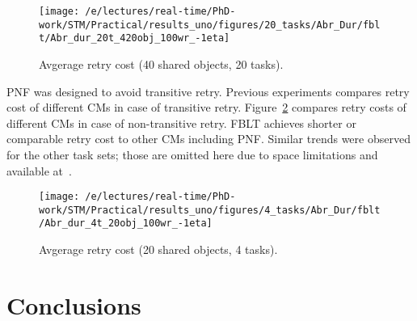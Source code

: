 \documentclass[conference]{IEEEtran}
\begin{document}
%
\begin{figure}
\centering
\texttt{[image: /e/lectures/real-time/PhD-work/STM/Practical/results\_uno/figures/20\_tasks/Abr\_Dur/fblt/Abr\_dur\_20t\_420obj\_100wr\_-1eta]}
\caption{Avgerage retry cost (40 shared objects, 20 tasks).}
\label{fig-RC-fblt-20t-40obj}
\end{figure}
%
PNF was designed to avoid transitive retry. Previous experiments compares retry cost of different CMs in case of transitive retry. Figure~\ref{fig-RC-fblt-4t-20obj_non_transitive} 
compares retry costs of different CMs in case of non-transitive retry. FBLT achieves shorter or comparable retry cost to other CMs including PNF. Similar trends were observed for the other task
sets; those are omitted here due to space limitations and available at~\cite{stmconcurrencycontrol_techreport}.
%
\begin{figure}
\centering
\texttt{[image: /e/lectures/real-time/PhD-work/STM/Practical/results\_uno/figures/4\_tasks/Abr\_Dur/fblt/Abr\_dur\_4t\_20obj\_100wr\_-1eta]}
\caption{Avgerage retry cost (20 shared objects, 4 tasks).}
\label{fig-RC-fblt-4t-20obj_non_transitive}
\end{figure}
%
\begin{comment}
\begin{figure}
\centering
\texttt{[image: /e/lectures/real-time/PhD-work/STM/Practical/results\_uno/figures/8\_tasks/Abr\_Dur/fblt/Abr\_dur\_8t\_20obj\_100wr\_-1eta]}
\caption{Avgerage retry cost (20 shared objects, 8 tasks).}
\label{fig-RC-fblt-8t-20obj_non_transitive}
\end{figure}

\begin{figure}
\centering
\texttt{[image: /e/lectures/real-time/PhD-work/STM/Practical/results\_uno/figures/20\_tasks/Abr\_Dur/fblt/Abr\_dur\_20t\_20obj\_100wr\_-1eta]}
\caption{Avgerage retry cost (20 shared objects, 20 tasks).}
\label{fig-RC-fblt-20t-20obj_non_transitive}
\end{figure}
\end{comment}


\section{Conclusions}\label{conclusion}
\end{document}
